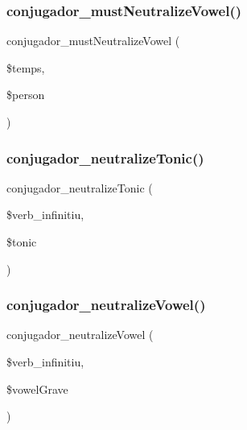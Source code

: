 \subsubsection{\texorpdfstring{conjugador\+\_\+must\+Neutralize\+Vowel()}{conjugador\_mustNeutralizeVowel()}}
{\footnotesize\ttfamily conjugador\+\_\+must\+Neutralize\+Vowel (\begin{DoxyParamCaption}\item[{}]{\$temps,  }\item[{}]{\$person }\end{DoxyParamCaption})}

\hypertarget{php_2conjugador__gr3_8inc_a947ef6897639f09bfec229c106a1baa3}{}\label{php_2conjugador__gr3_8inc_a947ef6897639f09bfec229c106a1baa3} 
\subsubsection{\texorpdfstring{conjugador\+\_\+neutralize\+Tonic()}{conjugador\_neutralizeTonic()}}
{\footnotesize\ttfamily conjugador\+\_\+neutralize\+Tonic (\begin{DoxyParamCaption}\item[{}]{\$verb\+\_\+infinitiu,  }\item[{}]{\$tonic }\end{DoxyParamCaption})}

\hypertarget{php_2conjugador__gr3_8inc_ab7dc6b4f2a809a04cbe98e6885a895dc}{}\label{php_2conjugador__gr3_8inc_ab7dc6b4f2a809a04cbe98e6885a895dc} 
\subsubsection{\texorpdfstring{conjugador\+\_\+neutralize\+Vowel()}{conjugador\_neutralizeVowel()}}
{\footnotesize\ttfamily conjugador\+\_\+neutralize\+Vowel (\begin{DoxyParamCaption}\item[{}]{\$verb\+\_\+infinitiu,  }\item[{}]{\$vowel\+Grave }\end{DoxyParamCaption})}



